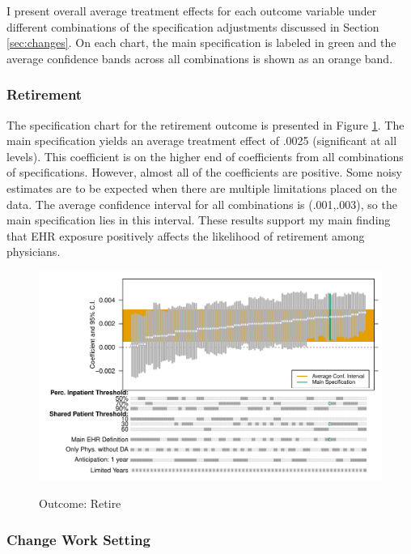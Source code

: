 \documentclass[12pt]{article}
\begin{document}
I present overall average treatment effects for each outcome variable under different combinations of the specification adjustments discussed in Section \ref{sec:changes}. On each chart, the main specification is labeled in green and the average confidence bands across all combinations is shown as an orange band. 

\subsubsection{Retirement}

The specification chart for the retirement outcome is presented in Figure \ref{fig:retire_chart}. The main specification yields an average treatment effect of .0025 (significant at all levels). This coefficient is on the higher end of coefficients from all combinations of specifications. However, almost all of the coefficients are positive. Some noisy estimates are to be expected when there are multiple limitations placed on the data. The average confidence interval for all combinations is (.001,.003), so the main specification lies in this interval. These results support my main finding that EHR exposure positively affects the likelihood of retirement among physicians. 

\begin{figure}[ht]
    \centering
    \caption{Outcome: Retire}
    \includegraphics[scale=.7]{Objects/retire_chart.pdf}
    \label{fig:retire_chart}
\end{figure}

\subsubsection{Change Work Setting}
\end{document}
